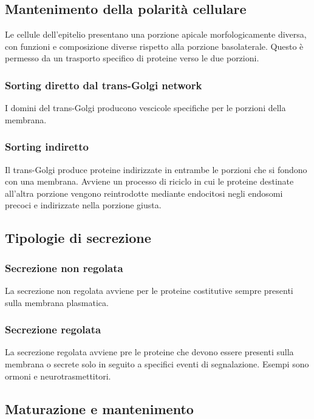 	\subsection{Mantenimento della polarit\`a cellulare}
	Le cellule dell'epitelio presentano una porzione apicale morfologicamente diversa, con funzioni e composizione diverse rispetto alla porzione basolaterale.
	Questo \`e permesso da un trasporto specifico di proteine verso le due porzioni.

		\subsubsection{Sorting diretto dal trans-Golgi network}
		I domini del trans-Golgi producono vescicole specifiche per le porzioni della membrana.

		\subsubsection{Sorting indiretto}
		Il trans-Golgi produce proteine indirizzate in entrambe le porzioni che si fondono con una membrana.
		Avviene un processo di riciclo in cui le proteine destinate all'altra porzione vengono reintrodotte mediante endocitosi negli endosomi precoci e indirizzate nella porzione giusta.


	\subsection{Tipologie di secrezione}
	
		\subsubsection{Secrezione non regolata}
		La secrezione non regolata avviene per le proteine costitutive sempre presenti sulla membrana plasmatica.

		\subsubsection{Secrezione regolata}
		La secrezione regolata avviene pre le proteine che devono essere presenti sulla membrana o secrete solo in seguito a specifici eventi di segnalazione.
		Esempi sono ormoni e neurotrasmettitori.

	\subsection{Maturazione e mantenimento}

